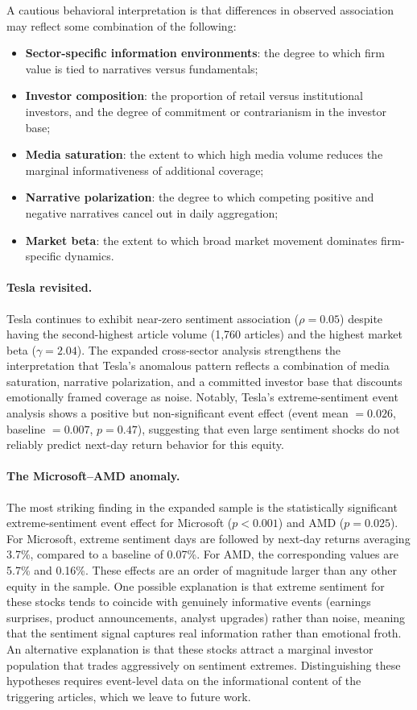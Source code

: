 \documentclass[lettersize,journal]{IEEEtran}
\begin{document}
A cautious behavioral interpretation is that differences in observed association may reflect some combination of the following:
\begin{itemize}
    \item \textbf{Sector-specific information environments}: the degree to which firm value is tied to narratives versus fundamentals;
    \item \textbf{Investor composition}: the proportion of retail versus institutional investors, and the degree of commitment or contrarianism in the investor base;
    \item \textbf{Media saturation}: the extent to which high media volume reduces the marginal informativeness of additional coverage;
    \item \textbf{Narrative polarization}: the degree to which competing positive and negative narratives cancel out in daily aggregation;
    \item \textbf{Market beta}: the extent to which broad market movement dominates firm-specific dynamics.
\end{itemize}

\paragraph{Tesla revisited.}
Tesla continues to exhibit near-zero sentiment association ($\rho = 0.05$) despite having the second-highest article volume (1{,}760 articles) and the highest market beta ($\gamma = 2.04$). The expanded cross-sector analysis strengthens the interpretation that Tesla's anomalous pattern reflects a combination of media saturation, narrative polarization, and a committed investor base that discounts emotionally framed coverage as noise. Notably, Tesla's extreme-sentiment event analysis shows a positive but non-significant event effect (event mean $= 0.026$, baseline $= 0.007$, $p = 0.47$), suggesting that even large sentiment shocks do not reliably predict next-day return behavior for this equity.

\paragraph{The Microsoft--AMD anomaly.}
The most striking finding in the expanded sample is the statistically significant extreme-sentiment event effect for Microsoft ($p < 0.001$) and AMD ($p = 0.025$). For Microsoft, extreme sentiment days are followed by next-day returns averaging 3.7\%, compared to a baseline of 0.07\%. For AMD, the corresponding values are 5.7\% and 0.16\%. These effects are an order of magnitude larger than any other equity in the sample. One possible explanation is that extreme sentiment for these stocks tends to coincide with genuinely informative events (earnings surprises, product announcements, analyst upgrades) rather than noise, meaning that the sentiment signal captures real information rather than emotional froth. An alternative explanation is that these stocks attract a marginal investor population that trades aggressively on sentiment extremes. Distinguishing these hypotheses requires event-level data on the informational content of the triggering articles, which we leave to future work.
\end{document}
